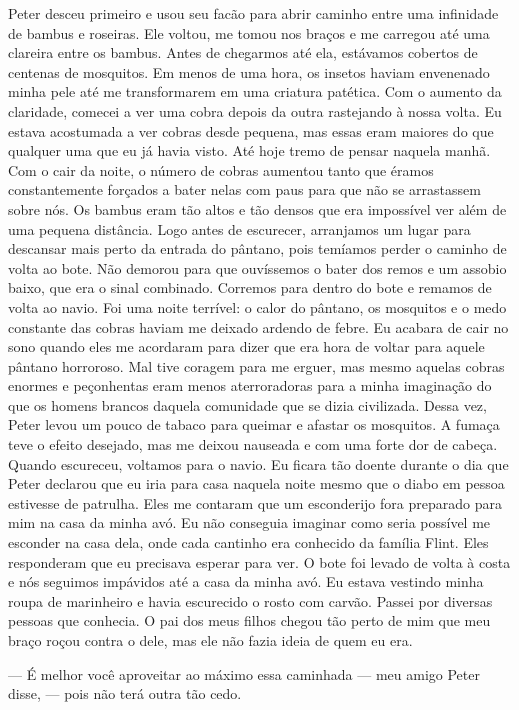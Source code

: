 Peter desceu primeiro e usou seu facão
para abrir caminho entre uma infinidade de bambus e roseiras. Ele
voltou, me tomou nos braços e me carregou até uma clareira entre os
bambus. Antes de chegarmos até ela, estávamos cobertos de centenas de
mosquitos. Em menos de uma hora, os insetos haviam envenenado minha pele
até me transformarem em uma criatura patética. Com o aumento da
claridade, comecei a ver uma cobra depois da outra rastejando à nossa
volta. Eu estava acostumada a ver cobras desde pequena, mas essas eram
maiores do que qualquer uma que eu já havia visto. Até hoje tremo de
pensar naquela manhã. Com o cair da noite, o número de cobras aumentou
tanto que éramos constantemente forçados a bater nelas com paus para que
não se arrastassem sobre nós. Os bambus eram tão altos e tão densos que
era impossível ver além de uma pequena distância. Logo antes de
escurecer, arranjamos um lugar para descansar mais perto da entrada do
pântano, pois temíamos perder o caminho de volta ao bote. Não demorou
para que ouvíssemos o bater dos remos e um assobio baixo, que era o
sinal combinado. Corremos para dentro do bote e remamos de volta ao
navio. Foi uma noite terrível: o calor do pântano, os mosquitos e o medo
constante das cobras haviam me deixado ardendo de febre. Eu acabara de
cair no sono quando eles me acordaram para dizer que era hora de voltar
para aquele pântano horroroso. Mal tive coragem para me erguer, mas
mesmo aquelas cobras enormes e peçonhentas eram menos aterroradoras para
a minha imaginação do que os homens brancos daquela comunidade que se
dizia civilizada. Dessa vez, Peter levou um pouco de tabaco para queimar
e afastar os mosquitos. A fumaça teve o efeito desejado, mas me deixou
nauseada e com uma forte dor de cabeça. Quando escureceu, voltamos para
o navio. Eu ficara tão doente durante o dia que Peter declarou que eu
iria para casa naquela noite mesmo que o diabo em pessoa estivesse de
patrulha. Eles me contaram que um esconderijo fora preparado para mim na
casa da minha avó. Eu não conseguia imaginar como seria possível me
esconder na casa dela, onde cada cantinho era conhecido da família
Flint. Eles responderam que eu precisava esperar para ver. O bote foi
levado de volta à costa e nós seguimos impávidos até a casa da minha
avó. Eu estava vestindo minha roupa de marinheiro e havia escurecido o
rosto com carvão. Passei por diversas pessoas que conhecia. O pai dos
meus filhos chegou tão perto de mim que meu braço roçou contra o dele,
mas ele não fazia ideia de quem eu era.

--- É melhor você aproveitar ao máximo
essa caminhada --- meu amigo Peter disse, --- pois não terá outra tão
cedo.

